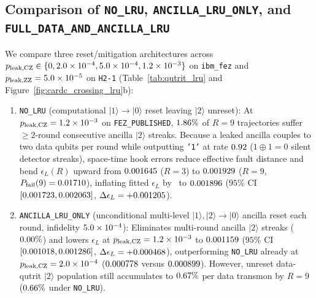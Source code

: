 \documentclass[aps,prx,twocolumn,superscriptaddress,nofootinbib]{revtex4-2}
\begin{document}
\subsection{Comparison of \texttt{NO\_LRU}, \texttt{ANCILLA\_LRU\_ONLY}, and \texttt{FULL\_DATA\_AND\_ANCILLA\_LRU}}
We compare three reset/mitigation architectures across $p_{\mathrm{leak,CZ}} \in \{0, 2.0 \times 10^{-4}, 5.0 \times 10^{-4}, 1.2 \times 10^{-3}\}$ on \texttt{ibm\_fez} and $p_{\mathrm{leak,ZZ}} = 5.0 \times 10^{-5}$ on \texttt{H2-1} (Table~\ref{tab:qutrit_lru} and Figure~\ref{fig:cardc_crossing_lru}b):
\begin{enumerate}
  \item \texttt{NO\_LRU} (computational $|1\rangle \to |0\rangle$ reset leaving $|2\rangle$ unreset): At $p_{\mathrm{leak,CZ}} = 1.2 \times 10^{-3}$ on \texttt{FEZ\_PUBLISHED}, $1.86\%$ of $R = 9$ trajectories suffer $\ge 2$-round consecutive ancilla $|2\rangle$ streaks. Because a leaked ancilla couples to two data qubits per round while outputting \texttt{'1'} at rate $0.92$ ($1 \oplus 1 = 0$ silent detector streaks), space-time hook errors reduce effective fault distance and bend $\epsilon_L(R)$ upward from $0.001645$ ($R = 3$) to $0.001929$ ($R = 9$, $P_{\mathrm{fail}}(9) = 0.01710$), inflating fitted $\epsilon_L$ by \ecqLruNoHighInflX\ to $0.001896$ ($95\%$ CI $[0.001723, 0.002063]$, $\Delta\epsilon_L = +0.001205$).
  \item \texttt{ANCILLA\_LRU\_ONLY} (unconditional multi-level $|1\rangle,|2\rangle \to |0\rangle$ ancilla reset each round, infidelity $5.0 \times 10^{-4}$): Eliminates multi-round ancilla $|2\rangle$ streaks ($0.00\%$) and lowers $\epsilon_L$ at $p_{\mathrm{leak,CZ}} = 1.2 \times 10^{-3}$ to $0.001159$ ($95\%$ CI $[0.001018, 0.001286]$, $\Delta\epsilon_L = +0.000468$), outperforming \texttt{NO\_LRU} already at $p_{\mathrm{leak,CZ}} = 2.0 \times 10^{-4}$ ($0.000778$ versus $0.000899$). However, unreset data-qutrit $|2\rangle$ population still accumulates to $0.67\%$ per data transmon by $R = 9$ ($0.66\%$ under \texttt{NO\_LRU}).

\end{enumerate}
\end{document}
